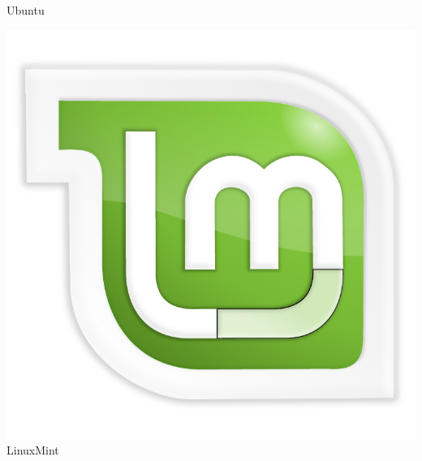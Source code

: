 \documentclass[hyperref={colorlinks}]{beamer}
\begin{document}
\begin{frame}
\begin{minipage}[b][.30\textheight][t]{.3\textwidth}
    \centering
    Ubuntu
    \end{minipage}\hfill
    \begin{minipage}[b][.30\textheight][t]{.3\textwidth}
    \includegraphics[width=.7\textwidth]{figs/logo-linuxmint.pdf}\\
    \centering
    LinuxMint
    \end{minipage}\\[0.5em]


\end{frame}
\end{document}
